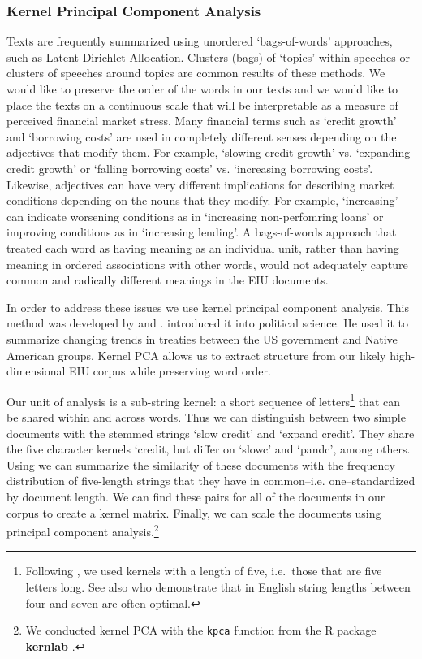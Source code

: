 \documentclass[]{article}
\begin{document}
\subsubsection{Kernel Principal Component
Analysis}\label{kernel-principal-component-analysis}

Texts are frequently summarized using unordered `bags-of-words'
approaches, such as Latent Dirichlet Allocation. Clusters (bags) of `topics' within speeches or clusters of speeches around topics \citep[for a review see][]{Grimmer2013} are common results of these methods. We would like to preserve the order of the words in our texts and we would like to place the texts on a continuous scale that will be interpretable as a measure of perceived financial market stress. Many financial terms such as `credit growth' and `borrowing costs' are used in completely different senses depending on the adjectives that modify them. For example, `slowing credit growth' vs. `expanding credit growth' or `falling borrowing costs' vs. `increasing borrowing costs'. Likewise, adjectives can have very different implications for describing market conditions depending on the nouns that they modify. For example, `increasing' can indicate worsening conditions as in `increasing non-perfomring loans' or improving conditions as in `increasing lending'.  A
bags-of-words approach that treated each word as having meaning as an individual unit, rather than having meaning in ordered associations with other words, would not adequately capture common and radically different meanings in the EIU documents.

In order to address these issues we use kernel principal component analysis. This method was developed by \cite{Scholkopf1998} and \cite{lodhi2002}. \cite{Spirling2012} introduced it into political science. He used it to summarize changing trends in treaties between the US government and Native American groups. Kernel PCA allows us to extract structure from our likely high-dimensional EIU corpus \cite[6531--6537]{Zhang2010} while preserving word order.

Our unit of analysis is a sub-string kernel: a short sequence of letters\footnote{Following \cite{Spirling2012}, we used kernels with a length of five, i.e.~those that are five letters long. See also \cite{lodhi2002} who demonstrate that in English  string lengths between four and seven are often optimal.} that can be shared within and across words. Thus we can distinguish between two simple documents with the stemmed strings `slow credit' and `expand credit'. They share the five character kernels `credit, but differ on `slowc' and `pandc', among others. Using \cite{lodhi2002} we can summarize the similarity of these documents with the frequency distribution of five-length strings that they have in common--i.e. one--standardized by document length. We can find these pairs
for all of the documents in our corpus to create a kernel matrix. Finally, we can scale the documents using principal component analysis.\footnote{We conducted kernel PCA with the \texttt{kpca} function from the R package \textbf{kernlab} \citep{kerblabCite}.}
\end{document}

